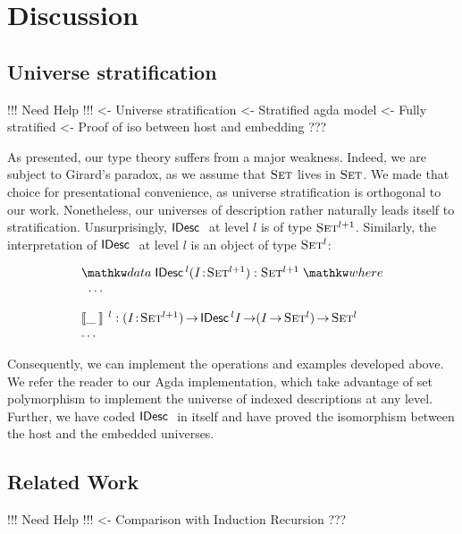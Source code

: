 \section{Discussion}
\label{sec:discussion}

\subsection{Universe stratification}

\begin{wstructure}
!!! Need Help !!!
<- Universe stratification
    <- Stratified agda model
        <- Fully stratified
        <- Proof of iso between host and embedding
    ???
\end{wstructure}

As presented, our type theory suffers from a major weakness. Indeed,
we are subject to Girard's paradox, as we assume that $\Set$ lives in
$\Set$. We made that choice for presentational convenience, as
universe stratification is orthogonal to our work. Nonetheless, our
universes of description rather naturally leads itself to
stratification. Unsurprisingly, $\IDesc{}$ at level $l$ is of type
$\Set^{\blue{l+1}}$. Similarly, the interpretation of $\IDesc{}$ at
level $l$ is an object of type $\Set^{\blue{l}}$:

\[\stk{
\data \IDesc{\!}^{\blue{l}} (\Bhab{\V{I}}{\Set^{\blue{l+1}}}) : \Set^{\blue{l+1}} \where \\
\;\;\ldots \\
\\
\idescop{\_\:}{}{}^{\blue{l}} : \PI{\V{I}}{\Set^{\blue{l+1}}} \IDesc{{\!}^{\blue{l}}\V{I}} \To (\V{I} \To \Set^{\blue{l}}) \To \Set^{\blue{l}}    \\
\ldots
}\]

Consequently, we can implement the operations and examples developed
above. We refer the reader to our Agda implementation, which take
advantage of set polymorphism to implement the universe of indexed
descriptions at any level. Further, we have coded $\IDesc{}$ in itself
and have proved the isomorphism between the host and the embedded
universes.

\subsection{Related Work}

\begin{structure}
!!! Need Help !!!
<- Comparison with Induction Recursion
    ???
\end{structure}


